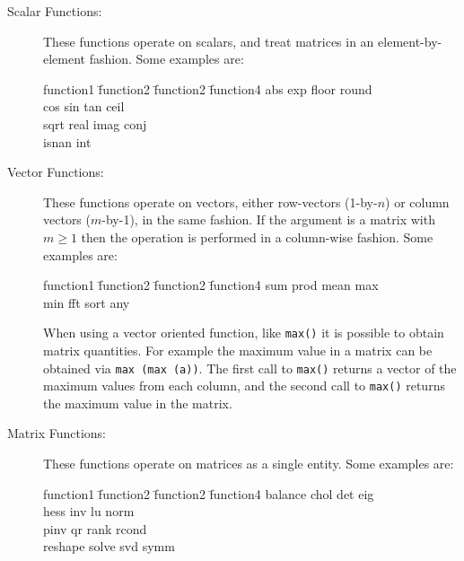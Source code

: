    \begin{description}

     \item[Scalar Functions:] These functions operate on scalars, and
           treat matrices in an element-by-element fashion. Some
           examples are:

           \begin{tabbing}
             function1 \= function2 \= function2 \= function4 \kill        
             abs \> exp \> floor \> round \\
             cos \> sin \> tan \> ceil \\
             sqrt \> real \> imag \> conj \\
             isnan \> int \> \> \\
           \end{tabbing}

     \item[Vector Functions:] These functions operate on vectors,
           either row-vectors (1-by-$n$) or column vectors ($m$-by-1),
           in the same fashion.  If the argument is a matrix with $m
           \geq 1$ then the operation is performed in a column-wise
           fashion. Some examples are:

           \begin{tabbing}
             function1 \= function2 \= function2 \= function4 \kill        
             sum \> prod \> mean \> max \\
             min \> fft \> sort \> any \\
           \end{tabbing}

           When using a vector oriented function, like \verb+max()+ it
           is possible to obtain matrix quantities. For example the
           maximum value in a matrix can be obtained via 
           \verb+max (max (a))+. The first call to \verb+max()+
           returns a vector of the maximum values from each column,
           and the second call to \verb+max()+ returns the maximum
           value in the matrix.

     \item[Matrix Functions:] These functions operate on matrices as a
           single entity. Some examples are:

           \begin{tabbing}
             function1 \= function2 \= function2 \= function4 \kill        
             balance \> chol \> det \> eig \\
             hess \> inv \> lu \> norm \\
             pinv \> qr \> rank \> rcond \\
             reshape \> solve \> svd \> symm \\
           \end{tabbing}


\end{description}
